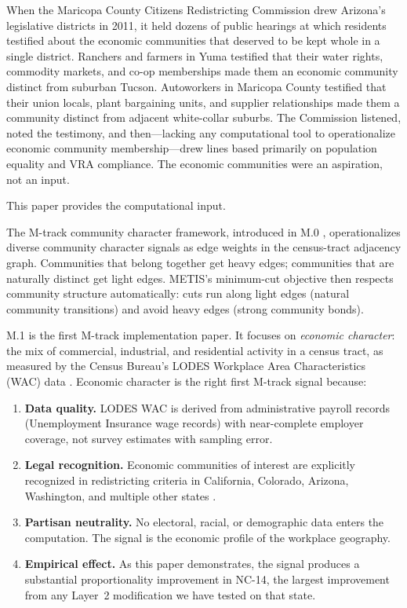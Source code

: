 \label{sec:introduction}

When the Maricopa County Citizens Redistricting Commission drew Arizona's
legislative districts in 2011, it held dozens of public hearings at which
residents testified about the economic communities that deserved to be kept
whole in a single district.
Ranchers and farmers in Yuma testified that their water rights, commodity
markets, and co-op memberships made them an economic community distinct from
suburban Tucson.
Autoworkers in Maricopa County testified that their union locals, plant
bargaining units, and supplier relationships made them a community distinct
from adjacent white-collar suburbs.
The Commission listened, noted the testimony, and then---lacking any
computational tool to operationalize economic community membership---drew
lines based primarily on population equality and VRA compliance.
The economic communities were an aspiration, not an input.

This paper provides the computational input.

The M-track community character framework, introduced in M.0
\citep{m0framework}, operationalizes diverse community character signals
as edge weights in the census-tract adjacency graph.
Communities that belong together get heavy edges; communities that are
naturally distinct get light edges.
METIS's minimum-cut objective then respects community structure automatically:
cuts run along light edges (natural community transitions) and avoid heavy
edges (strong community bonds).

M.1 is the first M-track implementation paper.
It focuses on \emph{economic character}: the mix of commercial, industrial,
and residential activity in a census tract, as measured by the Census
Bureau's LODES Workplace Area Characteristics (WAC) data
\citep{abowd2009lodes}.
Economic character is the right first M-track signal because:

\begin{enumerate}
  \item \textbf{Data quality.} LODES WAC is derived from administrative
    payroll records (Unemployment Insurance wage records) with near-complete
    employer coverage, not survey estimates with sampling error.
  \item \textbf{Legal recognition.} Economic communities of interest are
    explicitly recognized in redistricting criteria in California, Colorado,
    Arizona, Washington, and multiple other states
    \citep{caprop11,coart5s44,azircprop106,warcw44}.
  \item \textbf{Partisan neutrality.} No electoral, racial, or demographic
    data enters the computation.
    The signal is the economic profile of the workplace geography.
  \item \textbf{Empirical effect.} As this paper demonstrates, the signal
    produces a substantial proportionality improvement in NC-14, the largest
    improvement from any Layer~2 modification we have tested on that state.
\end{enumerate}

